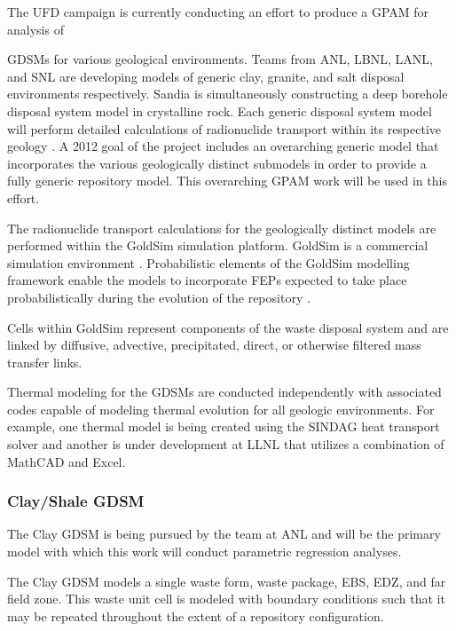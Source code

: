 The \gls{UFD} campaign is currently conducting an effort to produce
a \acrlong{GPAM} for analysis of {\glspl{GDSM} for various geological environments. 
Teams from \acrlong{ANL}, \acrlong{LBNL}, \acrlong{LANL}, and \acrlong{SNL} are developing
models of generic clay, granite, and salt disposal environments respectively. Sandia is
simultaneously constructing a deep borehole disposal system model in crystalline 
rock. Each generic disposal system model will perform detailed calculations of 
radionuclide transport within its respective geology 
\cite{clayton_generic_2011}. A 2012 goal of the 
project includes an overarching generic model that incorporates the various 
geologically distinct submodels in order to provide a fully generic repository 
model. This overarching \gls{GPAM} work will be used in this effort.

The radionuclide transport calculations for the geologically distinct models 
are performed within the GoldSim simulation platform. GoldSim is a commercial 
simulation environment \cite{kossik_goldsim_2006}.
Probabilistic elements of the GoldSim modelling framework enable the models to 
incorporate \gls{FEPs} expected to take place probabilistically during the 
evolution of the repository \cite{clayton_generic_2011}.  

Cells within GoldSim represent components of the waste disposal system and
are linked by diffusive, advective, precipitated, direct, or  otherwise filtered
mass transfer links. 

Thermal modeling for the \glspl{GDSM} are conducted independently with 
associated codes capable of modeling thermal evolution for all geologic 
environments.  For example, one thermal model is being created using the \gls{SINDAG} heat
transport solver and another is under development at \gls{LLNL} that utilizes 
a combination of MathCAD and Excel. 

\subsubsection{Clay/Shale GDSM}

The Clay \gls{GDSM} is being pursued by the team at \gls{ANL} and will be 
the primary model with which this work will conduct parametric regression 
analyses. 

The Clay \gls{GDSM} models a single waste form, waste package, \gls{EBS}, 
\gls{EDZ}, and far field zone. This waste unit cell is modeled with boundary 
conditions such that it may be repeated throughout the extent of a repository 
configuration. 

}
